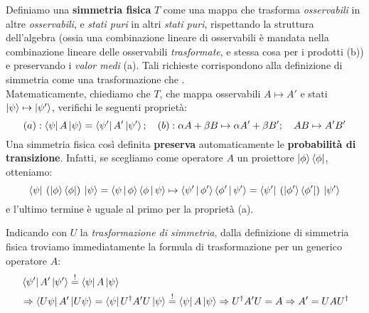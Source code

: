 \documentclass[../../FisicaTeorica.tex]{subfiles}
\begin{document}
\begin{dfn}\label{dfn:simmetria_fisica}
Definiamo una \textbf{simmetria fisica} $T$ come una mappa che trasforma \textit{osservabili} in altre \textit{osservabili}, e \textit{stati puri} in altri \textit{stati puri}, rispettando la struttura dell'algebra (ossia una combinazione lineare di osservabili è mandata nella combinazione lineare delle osservabili \textit{trasformate}, e stessa cosa per i prodotti (b)) e preservando i \textit{valor medi} (a). Tali richieste corrispondono alla definizione di simmetria come una trasformazione che .\\
Matematicamente, chiediamo che $T$, che mappa osservabili $A \mapsto A'$ e stati $\Ket{\psi}\mapsto \Ket{\psi'}$, verifichi le seguenti proprietà:
\[
(a):
\Bra{\psi}A\Ket{\psi} = \Bra{\psi'}A'\Ket{\psi'};\quad (b): \alpha A + \beta B \mapsto \alpha A' + \beta B'; \quad AB \mapsto A'B'
\]
Una simmetria fisica così definita \textbf{preserva} automaticamente le \textbf{probabilità di transizione}. Infatti, se scegliamo come operatore $A$ un proiettore $\Ket{\phi}\Bra{\phi}$, otteniamo:
\[
\Bra{\psi}\> (\Ket{\phi}\Bra{\phi}) \> \Ket{\psi} = \Braket{\psi|\phi}\Braket{\phi|\psi} \mapsto \Braket{\psi'|\phi'}\Braket{\phi' | \psi'} = \Bra{\psi'}\>(\Ket{\phi'}\Bra{\phi'})\>\Ket{\psi'}
\] 
e l'ultimo termine è uguale al primo per la proprietà (a).
\end{dfn} 

Indicando con $U$ la \textit{trasformazione di simmetria}, dalla definizione di simmetria fisica troviamo immediatamente la formula di trasformazione per un generico operatore $A$:
\begin{align}
    &\Bra{\psi'}A'\Ket{\psi'} \overset{!}{=} \Bra{\psi}A\Ket{\psi} \nonumber \\
    &\Rightarrow \Bra{U\psi}A'\Ket{U\psi} = \Bra{\psi}U^\dag A' U \Ket{\psi} \overset{!}{=} \Bra{\psi}A\Ket{\psi} \Rightarrow U^\dag A' U = A \Rightarrow A' = UAU^\dag \label{eqn:op_simmetrizzato}
\end{align}
\end{document}

